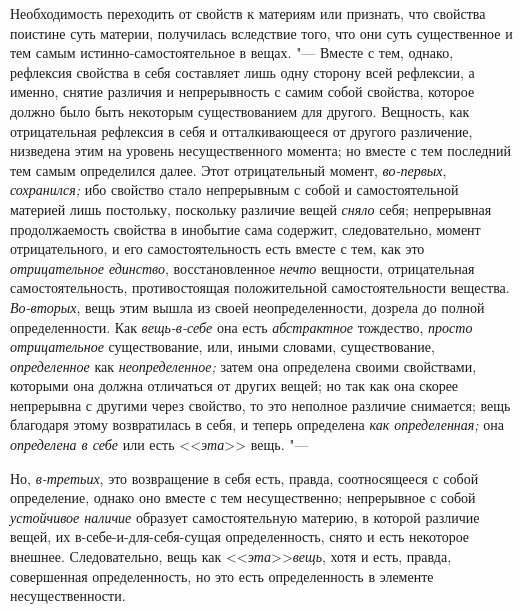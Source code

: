 Необходимость переходить от свойств к материям или признать, что свойства
поистине суть материи, получилась вследствие того, что они суть
существенное и тем самым истинно-самостоятельное в вещах. "--- Вместе с тем,
однако, рефлексия свойства в себя составляет лишь одну сторону всей
рефлексии, а именно, снятие различия и непрерывность с самим собой
свойства, которое должно было быть некоторым существованием для другого.
Вещность, как отрицательная рефлексия в себя и отталкивающееся от другого
различение, низведена этим на уровень несущественного момента; но вместе с
тем последний тем самым определился далее. Этот отрицательный момент,
{\em во-первых}, {\em сохранился;}
ибо свойство стало непрерывным с собой и самостоятельной материей лишь
постольку, поскольку различие вещей {\em сняло} себя;
непрерывная продолжаемость свойства в инобытие сама содержит,
следовательно, момент отрицательного, и его самостоятельность есть вместе с
тем, как это {\em отрицательное единство},
восстановленное {\em нечто} вещности, отрицательная
самостоятельность, противостоящая положительной самостоятельности вещества.
{\em Во-вторых}, вещь этим вышла из своей
неопределенности, дозрела до полной определенности. Как
{\em вещь-в-себе} она есть {\em абстрактное} тождество,
{\em просто отрицательное} существование, или, иными
словами, существование, {\em определенное} как
{\em неопределенное;} затем она определена своими
свойствами, которыми она должна отличаться от других вещей; но так как она
скорее непрерывна с другими через свойство, то это неполное различие
снимается; вещь благодаря этому возвратилась в себя, и теперь определена
{\em как определенная;} она {\em определена в себе} или есть
<<{\em эта}>> вещь. "---

Но, {\em в-третьих}, это возвращение в себя есть,
правда, соотносящееся с собой определение, однако оно вместе с тем
несущественно; непрерывное с собой {\em устойчивое
наличие} образует самостоятельную материю, в которой различие вещей, их
в-себе-и-для-себя-сущая определенность, снято и есть некоторое внешнее.
Следовательно, вещь как <<{\em эта}>>{\em вещь}, хотя и
есть, правда, совершенная определенность, но это есть определенность в
элементе несущественности.

